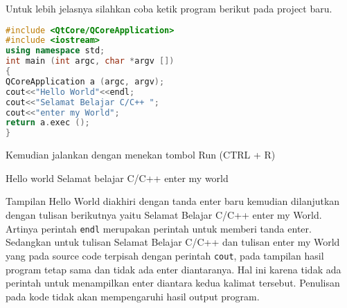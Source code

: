 Untuk lebih jelasnya silahkan coba ketik program berikut pada project
baru.

\begin{lstlisting}[language=c++, caption= struktur program C++]
#include <QtCore/QCoreApplication>  
#include <iostream>  
using namespace std;  
int main (int argc, char *argv [])  
{  
QCoreApplication a (argc, argv);  
cout<<"Hello World"<<endl;  
cout<<"Selamat Belajar C/C++ ";  
cout<<"enter my World";  
return a.exec ();  
}
\end{lstlisting}

Kemudian jalankan dengan menekan tombol Run (CTRL + R)

\begin{lcverbatim}
Hello world
Selamat belajar C/C++ enter my world
\end{lcverbatim}


Tampilan Hello World diakhiri dengan tanda enter baru kemudian
dilanjutkan dengan tulisan berikutnya yaitu Selamat Belajar C/C++ enter
my World. Artinya perintah \texttt{endl} merupakan perintah untuk
memberi tanda enter. Sedangkan untuk tulisan Selamat Belajar C/C++ dan
tulisan enter my World yang pada source code terpisah dengan perintah
\texttt{cout}, pada tampilan hasil program tetap sama dan tidak ada
enter diantaranya. Hal ini karena tidak ada perintah untuk menampilkan
enter diantara kedua kalimat tersebut. Penulisan pada kode tidak akan
mempengaruhi hasil output program.
